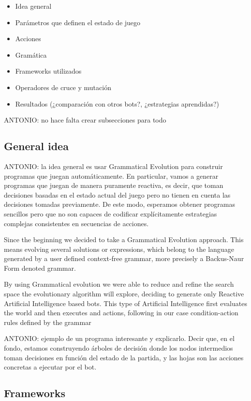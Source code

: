 \documentclass{llncs}
\begin{document}
\begin{itemize}
\item Idea general
\item Parámetros que definen el estado de juego
\item Acciones
\item Gramática
\item Frameworks utilizados
\item Operadores de cruce y mutación
\item Resultados (¿comparación con otros bots?, ¿estrategias aprendidas?)
\end{itemize}

{\color{red}ANTONIO: no hace falta crear subsecciones para todo}

\subsection{General idea}

{\color{red}ANTONIO: la idea general es usar Grammatical Evolution para construir programas que juegan automáticamente. En particular, vamos a generar programas que juegan de manera puramente reactiva, es decir, que toman decisiones basadas en el estado actual del juego pero no tienen en cuenta las decisiones tomadas previamente. De este modo, esperamos obtener programas sencillos pero que no son capaces de codificar explícitamente estrategias complejas consistentes en secuencias de acciones.}

Since the beginning we decided to take a Grammatical Evolution approach. This means evolving several solutions or expressions, which belong to the language generated by a user defined context-free grammar, more precisely a Backus-Naur Form denoted grammar. 

By using Grammatical evolution we were able to reduce and refine the search space the evolutionary algorithm will explore, deciding to generate only Reactive Artificial Intelligence based bots. This type of Artificial Intelligence first evaluates the world and then executes and actions, following in our case condition-action rules defined by the grammar

{\color{red}ANTONIO: ejemplo de un programa interesante y explicarlo. Decir que, en el fondo, estamos construyendo árboles de decisión donde los nodos intermedios toman decisiones en función del estado de la partida, y las hojas son las acciones concretas a ejecutar por el bot.}

\subsection{Frameworks}
\end{document}
